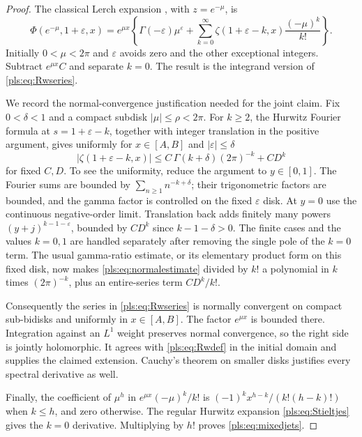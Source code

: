 \documentclass[11pt,letterpaper]{article}
\numberwithin{equation}{section}
\theoremstyle{definition}
\theoremstyle{remark}\newtheorem{remark}[theorem]{Remark}
\begin{document}
\begin{proof}
The classical Lerch expansion \cite[Eq.~25.14.3\_1]{DLMFLerch},
with $z=e^{-\mu}$, is
\begin{equation}\label{pls:eq:classicalLerch}
 \Phi(e^{-\mu},1+\varepsilon,x)
 =e^{\mu x}\left\{\Gamma(-\varepsilon)\mu^\varepsilon
       +\sum_{k=0}^\infty\zeta(1+\varepsilon-k,x)
                                     \frac{(-\mu)^k}{k!}\right\}.
\end{equation}
Initially $0<\mu<2\pi$ and $\varepsilon$ avoids zero and the
other exceptional integers. Subtract $e^{\mu x}C$ and separate
$k=0$. The result is the integrand version of
\eqref{pls:eq:Rwseries}.

We record the normal-convergence justification needed for the joint
claim. Fix $0<\delta<1$ and a compact subdisk $|\mu|\le\rho<2\pi$.
For $k\ge2$, the Hurwitz Fourier formula at
$s=1+\varepsilon-k$, together with integer translation in the
positive argument, gives uniformly for $x\in[A,B]$ and
$|\varepsilon|\le\delta$
\begin{equation}\label{pls:eq:normalestimate}
 |\zeta(1+\varepsilon-k,x)|
 \le C\,\Gamma(k+\delta)(2\pi)^{-k}+C D^k
\end{equation}
for fixed $C,D$. To see the uniformity, reduce the argument to
$y\in[0,1]$. The Fourier sums are bounded by
$\sum_{n\ge1}n^{-k+\delta}$; their trigonometric factors are
bounded, and the gamma factor is controlled on the fixed
$\varepsilon$ disk. At $y=0$ use the continuous negative-order
limit. Translation back adds finitely many powers
$(y+j)^{k-1-\varepsilon}$, bounded by $C D^k$ since
$k-1-\delta>0$. The finite cases and the values $k=0,1$ are
handled separately after removing the single pole of the $k=0$ term.
The usual gamma-ratio estimate, or its elementary product form on
this fixed disk, now makes \eqref{pls:eq:normalestimate} divided by
$k!$ a polynomial in $k$ times $(2\pi)^{-k}$, plus an entire-series
term $C D^k/k!$.

Consequently the series in \eqref{pls:eq:Rwseries} is normally
convergent on compact sub-bidisks and uniformly in $x\in[A,B]$.
The factor $e^{\mu x}$ is bounded there. Integration against an
$L^1$ weight preserves normal convergence, so the right side is
jointly holomorphic. It agrees with \eqref{pls:eq:Rwdef} in the
initial domain and supplies the claimed extension. Cauchy's theorem
on smaller disks justifies every spectral derivative as well.

Finally, the coefficient of $\mu^h$ in
$e^{\mu x}(-\mu)^k/k!$ is
$(-1)^k x^{h-k}/(k!(h-k)!)$ when $k\le h$, and zero otherwise.
The regular Hurwitz expansion \eqref{pls:eq:Stieltjes} gives the
$k=0$ derivative. Multiplying by $h!$ proves
\eqref{pls:eq:mixedjets}.
\end{proof}
\end{document}
